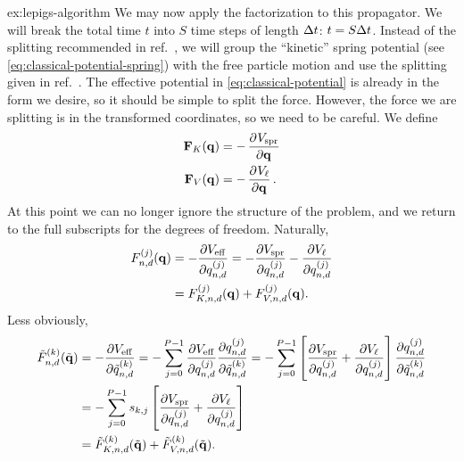 \begin{DefAnswer}{ex:lepigs-algorithm}
	We may now apply the factorization to this propagator.
	We will break the total time $t$ into $S$ time steps of length $\Delta t$: $t = S \Delta t$.
	Instead of the splitting recommended in ref.~\cite{bussi2007accurate}, we will group the ``kinetic'' spring potential (see \cref{eq:classical-potential-spring}) with the free particle motion and use the splitting given in ref.~\cite{ceriotti2010efficient}.
	The effective potential in \cref{eq:classical-potential} is already in the form we desire, so it should be simple to split the force.
	However, the force we are splitting is in the transformed coordinates, so we need to be careful.
	We define
	\begin{subequations}
	\begin{align}
		\vec{F}_K(\vec{q})
		&= -\dpd{\Vspring}{\vec{q}} \\
		\vec{F}_V(\vec{q})
		&= -\dpd{V_\links}{\vec{q}}.
	\end{align}
	\end{subequations}
	At this point we can no longer ignore the structure of the problem, and we return to the full subscripts for the degrees of freedom.
	Naturally,
	\begin{subequations}
	\begin{align}
		F_{n,d}^{(j)}(\bm{\mathbf{q}})
		&= -\frac{\partial V_\mathrm{eff}}{\partial q_{n,d}^{(j)}}
		= -\frac{\partial V_\mathrm{spr}}{\partial q_{n,d}^{(j)}} - \frac{\partial V_\ell}{\partial q_{n,d}^{(j)}} \\
		&= F_{K,n,d}^{(j)}(\bm{\mathbf{q}}) + F_{V,n,d}^{(j)}(\bm{\mathbf{q}}).
	\end{align}
	\end{subequations}
	Less obviously,
	\begin{subequations}
	\begin{align}
		\nm{F}_{n,d}\bead{k}(\nm{\vec{q}})
		&= -\frac{\partial \Veff}{\partial \nm{q}_{n,d}\bead{k}}
		= -\sum_{j=0}^{P-1} \frac{\partial \Veff}{\partial q_{n,d}\bead{j}} \frac{\partial q_{n,d}\bead{j}}{\partial \nm{q}_{n,d}\bead{k}}
		= -\sum_{j=0}^{P-1} \left[ \frac{\partial \Vspring}{\partial q_{n,d}\bead{j}} + \frac{\partial V_\links}{\partial q_{n,d}\bead{j}} \right] \frac{\partial q_{n,d}\bead{j}}{\partial \nm{q}_{n,d}\bead{k}} \\
		&= -\sum_{j=0}^{P-1} s_{k,j} \left[ \frac{\partial \Vspring}{\partial q_{n,d}\bead{j}} + \frac{\partial V_\links}{\partial q_{n,d}\bead{j}} \right]
				\label{eq:force-nm-transform} \\
		&= \nm{F}_{K,n,d}\bead{k}(\nm{\vec{q}}) + \nm{F}_{V,n,d}\bead{k}(\nm{\vec{q}}).

\end{align}
\end{subequations}
\end{DefAnswer}
